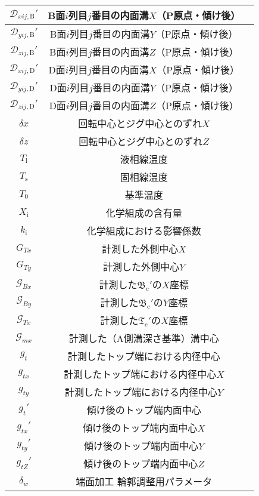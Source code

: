 \begin{longtable}{|c|Sl|}
$\mathcal D_{xij,\mathrm B}'$ & B面$i$列目$j$番目の内面溝$X$（P原点・傾け後）\\\hline
$\mathcal D_{yij,\mathrm B}'$ & B面$i$列目$j$番目の内面溝$Y$（P原点・傾け後）\\\hline
$\mathcal D_{zij,\mathrm B}'$ & B面$i$列目$j$番目の内面溝$Z$（P原点・傾け後）\\\hline
$\mathcal D_{xij,\mathrm D}'$ & D面$i$列目$j$番目の内面溝$X$（P原点・傾け後）\\\hline
$\mathcal D_{yij,\mathrm D}'$ & D面$i$列目$j$番目の内面溝$Y$（P原点・傾け後）\\\hline
$\mathcal D_{zij,\mathrm D}'$ & D面$i$列目$j$番目の内面溝$Z$（P原点・傾け後）\\\hline
$\delta x$ & 回転中心とジグ中心とのずれ$X$\\\hline
$\delta z$ & 回転中心とジグ中心とのずれ$Z$\\\hline
$T_\mathrm l$ & 液相線温度\\\hline
$T_\mathrm s$ & 固相線温度\\\hline
$T_0$ & 基準温度\\\hline
$X_\mathrm i$ & 化学組成の含有量\\\hline
$k_\mathrm i$ & 化学組成における影響係数\\\hline
\hline
$G_{Tx}$ & 計測した外側中心$X$\\\hline
$G_{Ty}$ & 計測した外側中心$Y$\\\hline
$\mathcal G_{Bx}$ & 計測した$\mathfrak B_\mathrm c'$の$X$座標\\\hline
$\mathcal G_{By}$ & 計測した$\mathfrak B_\mathrm c'$の$Y$座標\\\hline
$\mathcal G_{Tx}$ & 計測した$\mathfrak T_\mathrm c'$の$X$座標\\\hline
$\mathcal G_{mx}$ & 計測した（A側溝深さ基準）溝中心\\\hline
$g_t$ & 計測したトップ端における内径中心\\\hline
$g_{tx}$ & 計測したトップ端における内径中心$X$\\\hline
$g_{ty}$ & 計測したトップ端における内径中心$Y$\\\hline
$g_t'$ & 傾け後のトップ端内面中心\\\hline
$g_{tx}'$ & 傾け後のトップ端内面中心$X$\\\hline
$g_{ty}'$ & 傾け後のトップ端内面中心$Y$\\\hline
$g_{tZ}'$ & 傾け後のトップ端内面中心$Z$\\\hline
\hline
$\delta_w$ & 端面加工 輪郭調整用パラメータ\\\hline

\end{longtable}
